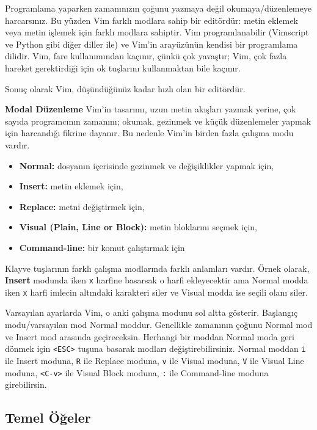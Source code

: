 \documentclass[
]{book}
\providecommand{\tightlist}{%
  \setlength{\itemsep}{0pt}\setlength{\parskip}{0pt}}
\begin{document}
Programlama yaparken zamanınızın çoğunu yazmaya değil okumaya/düzenlemeye harcarsınız. Bu yüzden Vim farklı modlara sahip bir editördür: metin eklemek veya metin işlemek için farklı modlara sahiptir. Vim programlanabilir (Vimscript ve Python gibi diğer diller ile) ve Vim'in arayüzünün kendisi bir programlama dilidir. Vim, fare kullanımından kaçınır, çünkü çok yavaştır; Vim, çok fazla hareket gerektirdiği için ok tuşlarını kullanmaktan bile kaçınır.

Sonuç olarak Vim, düşündüğünüz kadar hızlı olan bir editördür.

\textbf{Modal Düzenleme}
Vim'in tasarımı, uzun metin akışları yazmak yerine, çok sayıda programcının zamanını; okumak, gezinmek ve küçük düzenlemeler yapmak için harcandığı fikrine dayanır. Bu nedenle Vim'in birden fazla çalışma modu vardır.

\begin{itemize}
\tightlist
\item
  \textbf{Normal:} dosyanın içerisinde gezinmek ve değişiklikler yapmak için,
\item
  \textbf{Insert:} metin eklemek için,
\item
  \textbf{Replace:} metni değiştirmek için,
\item
  \textbf{Visual (Plain, Line or Block):} metin bloklarını seçmek için,
\item
  \textbf{Command-line:} bir komut çalıştırmak için
\end{itemize}

Klayve tuşlarının farklı çalışma modlarında farklı anlamları vardır. Örnek olarak, \textbf{Insert} modunda iken \texttt{x} harfine basarsak o harfi ekleyecektir ama Normal modda iken \texttt{x} harfi imlecin altındaki karakteri siler ve Visual modda ise seçili olanı siler.

Varsayılan ayarlarda Vim, o anki çalışma modunu sol altta gösterir. Başlangıç modu/varsayılan mod Normal moddur. Genellikle zamanının çoğunu Normal mod ve Insert mod arasında geçireceksin. Herhangi bir moddan Normal moda geri dönmek için \texttt{\textless{}ESC\textgreater{}} tuşuna basarak modları değiştirebilirsiniz. Normal moddan \texttt{i} ile Insert moduna, \texttt{R} ile Replace moduna, \texttt{v} ile Visual moduna, \texttt{V} ile Visual Line moduna, \texttt{\textless{}C-v\textgreater{}} ile Visual Block moduna, \texttt{:} ile Command-line moduna girebilirsin.

\hypertarget{temel-uxf6ux11feler}{%
\subsection*{Temel Öğeler}\label{temel-uxf6ux11feler}}
\end{document}
